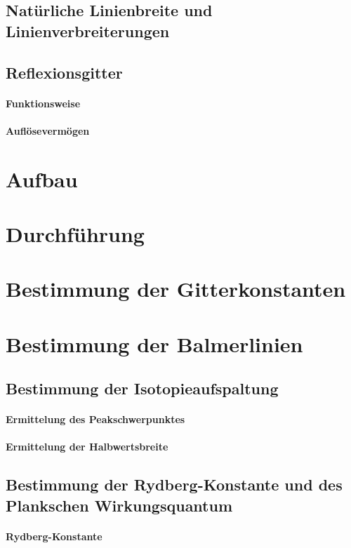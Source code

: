 \subsection{Natürliche Linienbreite und Linienverbreiterungen}
\subsection{Reflexionsgitter}
\paragraph{Funktionsweise}
\paragraph{Auflösevermögen}

\section{Aufbau}

\section{Durchführung}

\section{Bestimmung der Gitterkonstanten}

\section{Bestimmung der Balmerlinien}
\subsection{Bestimmung der Isotopieaufspaltung}
\paragraph{Ermittelung des Peakschwerpunktes}
\paragraph{Ermittelung der Halbwertsbreite}
\subsection{Bestimmung der Rydberg-Konstante und des Plankschen Wirkungsquantum}
\paragraph{Rydberg-Konstante}
